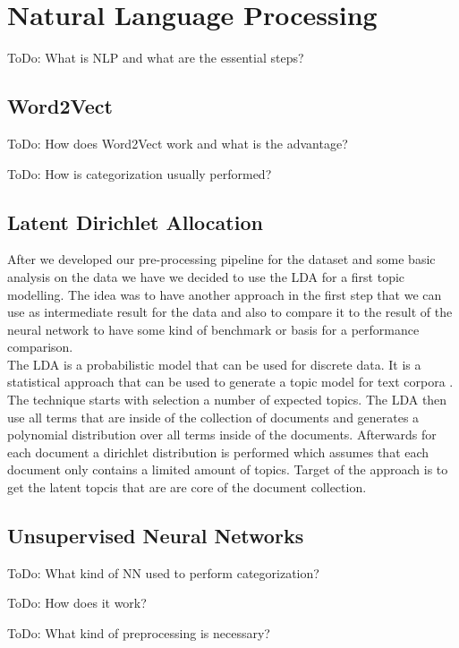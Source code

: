 \section{Natural Language Processing} %
\label{sec:nlp}

\colorbox{yellow!30}{ToDo:} What is NLP and what are the essential steps?

\subsection{Word2Vect} %
\label{sub:word_2_vect}

\colorbox{yellow!30}{ToDo:} How does Word2Vect work and what is the advantage?

\colorbox{yellow!30}{ToDo:} How is categorization usually performed?

\subsection{Latent Dirichlet Allocation} %
\label{sub:lda}
After we developed our pre-processing pipeline for the dataset and some basic analysis on the data we have we decided to use the LDA for a first topic modelling. The idea was to have another approach in the first step that we can use as intermediate result for the data and also to compare it to the result of the neural network to have some kind of benchmark or basis for a performance comparison.\\
The LDA is a probabilistic model that can be used for discrete data. It is a statistical approach that can be used to generate a topic model for text corpora \cite{blei_latent_nodate}. The technique starts with selection a number of expected topics. The LDA then use all terms that are inside of the collection of documents and generates a polynomial distribution over all terms inside of the documents. Afterwards for each document a dirichlet distribution is performed which assumes that each document only contains a limited amount of topics. Target of the approach is to get the latent topcis that are are core of the document collection.

\subsection{Unsupervised Neural Networks} %
\label{sub:unsup_nn}
\colorbox{yellow!30}{ToDo:} What kind of NN used to perform categorization?

\colorbox{yellow!30}{ToDo:} How does it work?

\colorbox{yellow!30}{ToDo:} What kind of preprocessing is necessary?


